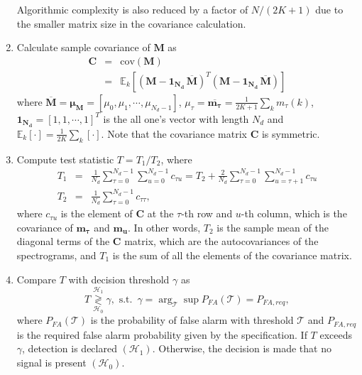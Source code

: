 \documentclass[draftclsnofoot,onecolumn,12pt]{IEEEtran}
\DeclareMathOperator*{\Arg}{arg}
\begin{document}
\begin{enumerate}
	  Algorithmic complexity is also reduced by a factor of $N/(2K+1)$ due to the smaller matrix size in the covariance calculation.
      \item Calculate sample covariance of $\mathbf{M}$ as
\begin{eqnarray}
            \mathbf{C} &=& \mathrm{cov}(\mathbf{M}) \nonumber \\
	    &=& \mathbb{E}_k\left[(\mathbf{M} - \boldsymbol{1_{N_d}} \, \overline{\mathbf{M}})^T (\mathbf{M} - \boldsymbol{1_{N_d}} \, \overline{\mathbf{M}}) \right]
\end{eqnarray}
        where $\overline{\mathbf{M}} = \boldsymbol{\mu_M} = [\mu_0, \mu_1, \cdots, \mu_{N_d-1}]$, $\mu_\tau = \overline{\mathbf{m_\tau}} = \frac{1}{2K+1} \sum_k m_\tau(k)$, $\boldsymbol{1_{N_d}} = [1, 1, \cdots, 1]^T$ is the all one's vector with length $N_d$ and $\mathbb{E}_k[\cdot] = \frac{1}{2K} \sum_k [\cdot]$.
	  Note that the covariance matrix $\mathbf{C}$ is symmetric.
      \item Compute test statistic $T = T_1/T_2$, where
          \begin{eqnarray}
              T_1 &=& \frac{1}{N_d} \sum_{\tau=0}^{N_d-1} \sum_{u=0}^{N_d-1} c_{\tau u} = T_2 + \frac{2}{N_d} \sum_{\tau=0}^{N_d-1} \sum_{u=\tau+1}^{N_d-1} c_{\tau u}\\
              T_2 &=& \frac{1}{N_d} \sum_{\tau=0}^{N_d-1} c_{\tau \tau},
          \end{eqnarray}
          where $c_{\tau u}$ is the element of $\mathbf{C}$ at the $\tau$-th row and $u$-th column, which is the covariance of $\mathbf{m_\tau}$ and $\mathbf{m_u}$. In other words, $T_2$ is the sample mean of the diagonal terms of the $\mathbf{C}$ matrix, which are the autocovariances of the spectrograms, and $T_1$ is the sum of all the elements of the covariance matrix.
      \item Compare $T$ with decision threshold $\gamma$ as
      \begin{equation}
	T  \overset{\mathcal{H}_1}{\underset{\mathcal{H}_0}{\gtrless}} \gamma, \,\,
	\mathrm{s.t.} \,\,\, \gamma  = \Arg_\mathcal{T} \sup P_{FA}(\mathcal{T}) = P_{FA,req}, \label{eq:gamma_def}
      \end{equation}
      where $P_{FA}(\mathcal{T})$ is the probability of false alarm with threshold $\mathcal{T}$
      and $P_{FA,req}$ is the required false alarm probability given by the specification. If $T$
      exceeds $\gamma$, detection is declared $\left(\mathcal{H}_1 \right)$. Otherwise, the decision is made that no signal is present $\left(\mathcal{H}_0 \right)$.
    \end{enumerate}
\end{document}
